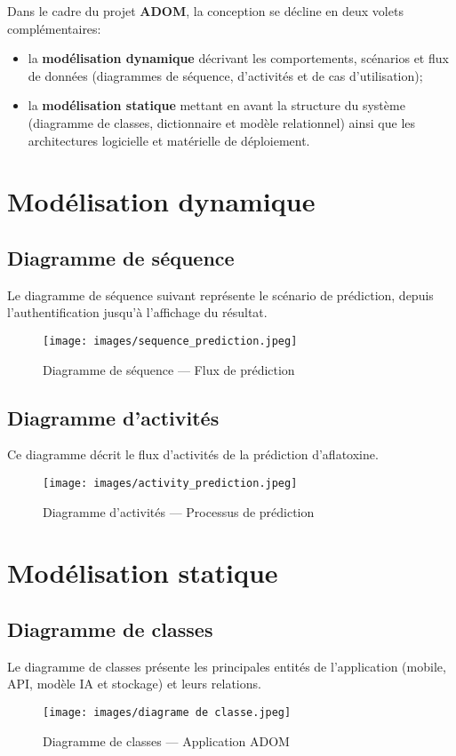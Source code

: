\documentclass[12pt,a4paper]{report}
\begin{document}
Dans le cadre du projet \textbf{ADOM}, la conception se décline en deux volets complémentaires:
\begin{itemize}
    \item la \textbf{modélisation dynamique} décrivant les comportements, scénarios et flux de données (diagrammes de séquence, d’activités et de cas d’utilisation);
    \item la \textbf{modélisation statique} mettant en avant la structure du système (diagramme de classes, dictionnaire et modèle relationnel) ainsi que les architectures logicielle et matérielle de déploiement.
\end{itemize}

\section{Modélisation dynamique}
\subsection{Diagramme de séquence}
Le diagramme de séquence suivant représente le scénario de prédiction,
depuis l’authentification jusqu’à l’affichage du résultat.
\begin{figure}[H]
    \centering
    \texttt{[image: images/sequence\_prediction.jpeg]}
    \caption{Diagramme de séquence — Flux de prédiction}
\end{figure}

\subsection{Diagramme d’activités}
Ce diagramme décrit le flux d’activités de la prédiction d’aflatoxine.
\begin{figure}[H]
    \centering
    \texttt{[image: images/activity\_prediction.jpeg]}
    \caption{Diagramme d’activités — Processus de prédiction}
\end{figure}
\cleardoublepage
\section{Modélisation statique}

\subsection{Diagramme de classes}
Le diagramme de classes présente les principales entités de l’application
(mobile, API, modèle IA et stockage) et leurs relations.
\begin{figure}[H]
    \centering
    \texttt{[image: images/diagrame de classe.jpeg]}
    \caption{Diagramme de classes — Application ADOM}
\end{figure}
\cleardoublepage
\end{document}

